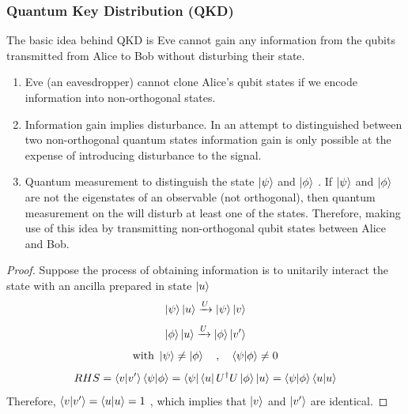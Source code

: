 \documentclass[]{book}
\theoremstyle{nonumberplain}
\begin{document}
\subsubsection{Quantum Key Distribution (QKD)}
The basic idea behind QKD is Eve cannot gain any information from the qubits transmitted from Alice to Bob without disturbing their state. 
\begin{enumerate}
    \item Eve (an eavesdropper) cannot clone Alice's qubit states if we encode information into non-orthogonal states. 
    \item Information gain implies disturbance. In an attempt to distinguished between two non-orthogonal quantum states information gain is only possible at the expense of introducing disturbance to the signal. 
    \item Quantum measurement to distinguish the state $\ket{\psi}$ and $\ket{\phi}$ . If $\ket{\psi}$ and $\ket{\phi}$ are not the eigenstates of an observable (not orthogonal), then quantum measurement on the will disturb at least one of the states. Therefore, making use of this idea by transmitting non-orthogonal qubit states between Alice and Bob. 
\end{enumerate}
\begin{proof}
    Suppose the process of obtaining information is to unitarily interact the state with an ancilla prepared in state $\ket{u}$
    \[
    \ket{\psi}\ket{u} \xrightarrow[]{U} \ket{\psi}\ket{v} \]\[
    \ket{\phi}\ket{u} \xrightarrow[]{U} \ket{\phi}\ket{v'} \]\[
    \text{with }\ket{\psi} \neq \ket{\phi} \quad ,\quad \braket{\psi|\phi} \neq 0 \]\[
    RHS = \braket{v|v'}\braket{\psi|\phi} = \bra{\psi}\bra{u}U^{\dagger}U\ket{\phi}\ket{u} = \braket{\psi|\phi}\braket{u|u}
    \]
    Therefore, $\braket{v|v'} = \braket{u|u} = 1$ , which implies that $\ket{v}$ and $\ket{v'}$ are identical. 
\end{proof}
\end{document}
